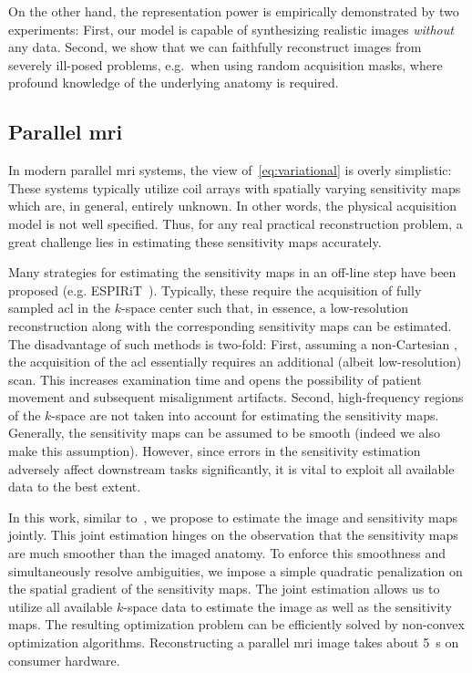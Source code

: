 \documentclass[twocolumn]{article}
\begin{document}
On the other hand, the representation power is empirically demonstrated by two experiments:
First, our model is capable of synthesizing realistic images \emph{without} any data.
Second, we show that we can faithfully reconstruct images from severely ill-posed problems, e.g.\ when using random acquisition masks, where profound knowledge of the underlying anatomy is required.
\subsection{Parallel \texorpdfstring{\gls{mri}}{MRI}}
\label{ssec:parallel imaging intro}
In modern parallel \gls{mri} systems, the view of~\cref{eq:variational} is overly simplistic:
These systems typically utilize coil arrays with spatially varying sensitivity maps~\cite{pruessmann} which are, in general, entirely unknown.
In other words, the physical acquisition model is not well specified.
Thus, for any real practical reconstruction problem, a great challenge lies in estimating these sensitivity maps accurately.

Many strategies for estimating the sensitivity maps in an off-line step have been proposed (e.g. ESPIRiT~\cite{uecker_espirit_13,McKenzie2002}).
Typically, these require the acquisition of fully sampled \gls{acl} in the \( k \)-space center such that, in essence, a low-resolution reconstruction along with the corresponding sensitivity maps can be estimated.
The disadvantage of such methods is two-fold:
First, assuming a non-Cartesian , the acquisition of the \gls{acl} essentially requires an additional (albeit low-resolution) scan.
This increases examination time and opens the possibility of patient movement and subsequent misalignment artifacts.
Second, high-frequency regions of the \( k \)-space are not taken into account for estimating the sensitivity maps.
Generally, the sensitivity maps can be assumed to be smooth (indeed we also make this assumption).
However, since errors in the sensitivity estimation adversely affect downstream tasks significantly, it is vital to exploit all available data to the best extent.

In this work, similar to~\cite{Knoll2011,uecker_image_2008,Ying2007}, we propose to estimate the image and sensitivity maps jointly.
This joint estimation hinges on the observation that the sensitivity maps are much smoother than the imaged anatomy.
To enforce this smoothness and simultaneously resolve ambiguities, we impose a simple quadratic penalization on the spatial gradient of the sensitivity maps.
The joint estimation allows us to utilize all available \( k \)-space data to estimate the image as well as the sensitivity maps.
The resulting optimization problem can be efficiently solved by  non-convex optimization algorithms.
Reconstructing a parallel \gls{mri} image takes about \qty{5}{\second} on consumer hardware.
\end{document}
